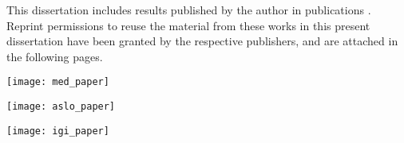 %
%

This dissertation includes results published by the author in publications \cite{prasanna_med, prasanna_igi, prasanna_aslo}. Reprint permissions to reuse the material from these works in this present dissertation have been granted by the respective publishers, and are attached in the following pages.

\begin{figure*}
 \centering
 \texttt{[image: med\_paper]}
 \caption[]{}
\end{figure*}

\begin{figure*}
 \centering
 \texttt{[image: aslo\_paper]}
 \caption[]{}
\end{figure*}

\begin{figure*}
 \centering
 \texttt{[image: igi\_paper]}
 \caption[]{}
\end{figure*}

